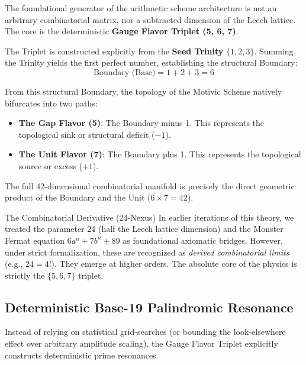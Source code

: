 The foundational generator of the arithmetic scheme architecture is not an arbitrary combinatorial matrix, nor a subtracted dimension of the Leech lattice. The core is the deterministic \textbf{Gauge Flavor Triplet (5, 6, 7)}. 

The Triplet is constructed explicitly from the \textbf{Seed Trinity} $\{1, 2, 3\}$. Summing the Trinity yields the first perfect number, establishing the structural Boundary:
\begin{equation}
    \text{Boundary (Base)} = 1 + 2 + 3 = 6
\end{equation}

From this structural Boundary, the topology of the Motivic Scheme natively bifurcates into two paths:
\begin{itemize}
    \item \textbf{The Gap Flavor (5)}: The Boundary minus 1. This represents the topological sink or structural deficit ($-1$).
    \item \textbf{The Unit Flavor (7)}: The Boundary plus 1. This represents the topological source or excess ($+1$).
\end{itemize}

The full 42-dimensional combinatorial manifold is precisely the direct geometric product of the Boundary and the Unit ($6 \times 7 = 42$).

\begin{theorembox}{The Combinatorial Derivative (24-Nexus)}
In earlier iterations of this theory, we treated the parameter $24$ (half the Leech lattice dimension) and the Monster Fermat equation $6a^n + 7b^n \pm 89$ as foundational axiomatic bridges. However, under strict formalization, these are recognized as \emph{derived combinatorial limits} (e.g., $24 = 4!$). They emerge at higher orders. The absolute core of the physics is strictly the $\{5, 6, 7\}$ triplet.
\end{theorembox}

\subsection{Deterministic Base-19 Palindromic Resonance}

Instead of relying on statistical grid-searches (or bounding the look-elsewhere effect over arbitrary amplitude scaling), the Gauge Flavor Triplet explicitly constructs deterministic prime resonances.

